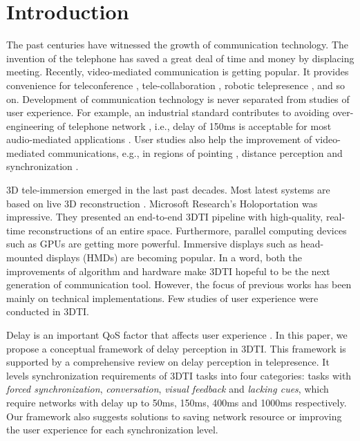 \section{Introduction}

The past centuries have witnessed the growth of communication technology. The invention of the telephone has saved a great deal of time and money by displacing meeting. Recently, video-mediated communication is getting popular. It provides convenience for teleconference \cite{marlow2016beyond}, tele-collaboration \cite{donovan2014understanding, avellino2015accuracy}, robotic telepresence \cite{jouppi2001robotic, misawa2015chameleonmask, neustaedter2016beam}, and so on. Development of communication technology is never separated from studies of user experience. For example, an industrial standard contributes to avoiding over-engineering of telephone network \cite{itu2003recommendation}, i.e., delay of 150ms is acceptable for most audio-mediated applications \cite{recommendation2003114, donovan2014understanding}. User studies also help the improvement of video-mediated communications, e.g., in regions of pointing \cite{higuchi2015immerseboard, avellino2015accuracy}, distance perception \cite{boustila2015evaluation, alexandrova2010egocentric} and synchronization \cite{geerts2011we, tam2012video, schmitt2014influence}.

3D tele-immersion emerged in the last past decades. Most latest systems are based on live 3D reconstruction \cite{kurillo2008immersive, petit2010multicamera, maimone2011encumbrance, maimone2012real}. Microsoft Research's Holoportation \cite{orts2016holoportation} was impressive. They presented an end-to-end 3DTI pipeline with high-quality, real-time reconstructions of an entire space. Furthermore, parallel computing devices such as GPUs are getting more powerful. Immersive displays such as head-mounted displays (HMDs) are becoming popular. In a word, both the improvements of algorithm and hardware make 3DTI hopeful to be the next generation of communication tool. However, the focus of previous works has been mainly on technical implementations. Few studies of user experience were conducted in 3DTI.

Delay is an important QoS factor that affects user experience \cite{brunnstrom2013qualinet, schmitt2014asymmetric, schmitt2013qoe}. In this paper, we propose a conceptual framework of delay perception in 3DTI. This framework is supported by a comprehensive review on delay perception in telepresence. It levels synchronization requirements of 3DTI tasks into four categories: tasks with \emph{forced synchronization}, \emph{conversation}, \emph{visual feedback} and \emph{lacking cues}, which require networks with delay up to 50ms, 150ms, 400ms and 1000ms respectively. Our framework also suggests solutions to saving network resource or improving the user experience for each synchronization level.

